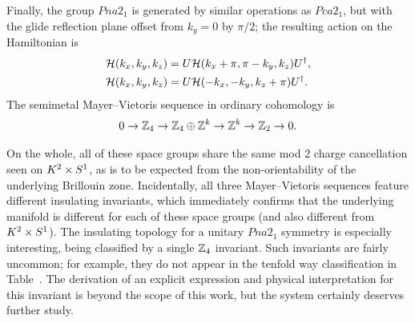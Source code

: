 Finally, the group $Pna2_1$ is generated by similar operations as $Pca2_1$, but with the glide reflection plane offset from $k_y=0$ by $\pi/2$; the resulting action on the Hamiltonian is
\begin{align*}
	\mathcal{H}(k_x, k_y, k_z) &= U\mathcal{H}(k_x+\pi, \pi-k_y, k_z)U^\dag, \\
	\mathcal{H}(k_x, k_y, k_z) &= U\mathcal{H}(-k_x, -k_y, k_z+\pi)U^\dag.
\end{align*}
The semimetal Mayer--Vietoris sequence in ordinary cohomology is
\begin{equation*}
	0 \to \mathbb{Z}_4 \to \mathbb{Z}_4\oplus\mathbb{Z}^k \to \mathbb{Z}^k \to \mathbb{Z}_2 \to 0.
\end{equation*}

On the whole, all of these space groups share the same mod 2 charge cancellation seen on $K^2\times S^1$, as is to be expected from the non-orientability of the underlying Brillouin zone. Incidentally, all three Mayer--Vietoris sequences feature different insulating invariants, which immediately confirms that the underlying manifold is different for each of these space groups (and also different from $K^2\times S^1$). The insulating topology for a unitary $Pna2_1$ symmetry is especially interesting, being classified by a single $\mathbb{Z}_4$ invariant. Such invariants are fairly uncommon; for example, they do not appear in the tenfold way classification in Table~\red{[ref]}. %
The derivation of an explicit expression and physical interpretation for this invariant is beyond the scope of this work, but the system certainly deserves further study.


\label{sec:inversion}

